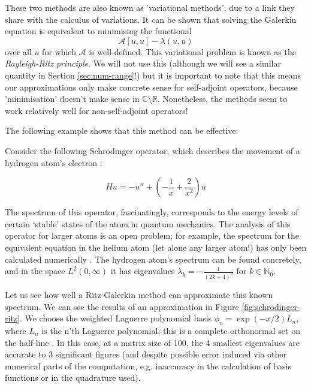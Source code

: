 \documentclass[../main.tex]{subfiles}
\begin{document}
\begin{remark}
These two methods are also known as 'variational methods', due to a link they share with 
the calculus of variations. It can be shown \cite{suli2003introduction} that 
solving the Galerkin equation is equivalent to minimising the functional
$$\mathcal{A}[u, u] - \lambda(u, u)$$
over all $u$ for which $\mathcal{A}$ is well-defined. This variational problem
is known as the \emph{Rayleigh-Ritz principle}. We will not use this (although
we will see a similar quantity in Section \ref{sec:num-range}!) but it is important
to note that this means our approximations only make concrete sense for self-adjoint
operators, because 'minimisation' doesn't make sense in $\mathbb{C}\setminus\mathbb{R}$.
Nonetheless, the methods seem to work relatively well for non-self-adjoint operators!
\end{remark}

The following example shows that this method can be effective:

\begin{example}
\label{ex:schrodinger-ritz}
Consider the following Schr\"odinger operator, which describes the movement of a
hydrogen atom's electron
\cite{pryce1993numerical}:

$$Hu = -u'' + (-\frac{1}{x} + \frac{2}{x^2})u$$
\end{example}

The spectrum of this operator, fascinatingly, corresponds to the energy levels
of certain `stable' states of the atom in quantum mechanics. The analysis of
this operator for larger atoms is an open problem; for example,
the spectrum for the equivalent equation in the helium atom (let alone any
larger atom!) has only been calculated numerically \cite{davies1995spectral}.
The hydrogen atom's spectrum can be found concretely, and in the space $L^2(0,
\infty)$ it has eigenvalues $\lambda_k = -\frac{1}{(2k + 4)^2}$ for $k \in
\mathbb{N}_0$.

Let us see how well a Ritz-Galerkin method can approximate this known spectrum.
We can see the results of an approximation in Figure \ref{fig:schrodinger-ritz}.
We choose the weighted Laguerre
polynomial basis $\phi_n = \exp(-x/2)L_n$, where $L_n$ is the n'th Laguerre
polynomial; this is a complete orthonormal set on the half-line
\cite{szego1975orthogonal}. In this case, at a matrix size of 100, the 4
smallest eigenvalues are accurate to 3 significant figures (and despite possible
error induced via other numerical parts of the computation, e.g. inaccuracy in
the calculation of basis functions or in the quadrature used).
\end{document}
